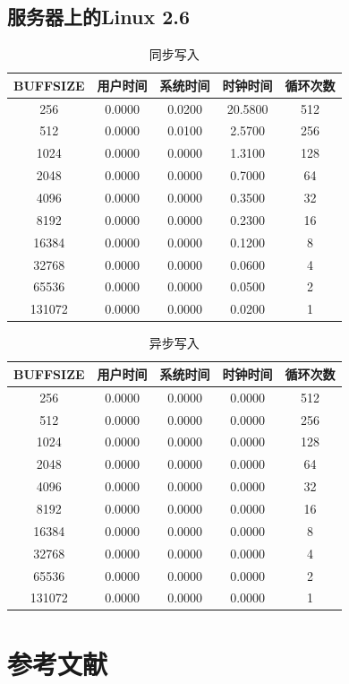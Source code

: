 \documentclass[a4paper,twoside]{article}
\begin{document}
\begin{spacing}{1.2}
\subsection{服务器上的Linux 2.6}



\begin{table}[H]
\centering
\caption{同步写入}
\begin{tabular}{c|c|c|c|c}
	\toprule
	\hline
	BUFFSIZE & 用户时间 & 系统时间 & 时钟时间 & 循环次数 \\
	\hline
	256    &  0.0000 & 0.0200 &20.5800 &512
	\\512    &  0.0000 & 0.0100 & 2.5700 &256
	\\1024   &  0.0000 & 0.0000 & 1.3100 &128
	\\2048   &  0.0000 & 0.0000 & 0.7000 &64
	\\4096   &  0.0000 & 0.0000 & 0.3500 &32
	\\8192   &  0.0000 & 0.0000 & 0.2300 &16
	\\16384  &  0.0000 & 0.0000 & 0.1200 &8
	\\32768  &  0.0000 & 0.0000 & 0.0600 &4
	\\65536  &  0.0000 & 0.0000 & 0.0500 &2
	\\131072 &  0.0000 & 0.0000 & 0.0200 &1
	\\\hline
	\bottomrule
\end{tabular}	
\end{table}

\begin{table}[H]
\centering
\caption{异步写入}
\begin{tabular}{c|c|c|c|c}
	\toprule
	\hline
	BUFFSIZE & 用户时间 & 系统时间 & 时钟时间 & 循环次数 \\
	\hline
	256     & 0.0000 & 0.0000 & 0.0000 & 512
	\\512     & 0.0000 & 0.0000 & 0.0000 & 256
	\\1024    & 0.0000 & 0.0000 & 0.0000 & 128
	\\2048    & 0.0000 & 0.0000 & 0.0000 & 64
	\\4096    & 0.0000 & 0.0000 & 0.0000 & 32
	\\8192    & 0.0000 & 0.0000 & 0.0000 & 16
	\\16384   & 0.0000 & 0.0000 & 0.0000 & 8
	\\32768   & 0.0000 & 0.0000 & 0.0000 & 4
	\\65536   & 0.0000 & 0.0000 & 0.0000 & 2
	\\131072  & 0.0000 & 0.0000 & 0.0000 & 1
	\\\hline
	\bottomrule
\end{tabular}	
\end{table}



\clearpage
\section*{参考文献}




\end{spacing}
\end{document}
